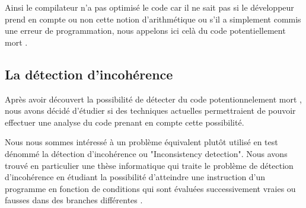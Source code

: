 Ainsi le compilateur n'a pas optimisé le code car il ne sait pas si le développeur prend en compte ou non cette notion d'arithmétique ou s'il a simplement commis une erreur de programmation, nous appelons ici celà du code \og potentiellement mort \fg{}.

\subsection{La détection d'incohérence}

Après avoir découvert la possibilité de détecter du code \og potentionnelement mort \fg{}, nous avons décidé d'étudier si des techniques actuelles permettraient de pouvoir effectuer une analyse du code prenant en compte cette possibilité.

Nous nous sommes intéressé à un problème équivalent plutôt utilisé en test dénommé la détection d'incohérence ou "Inconsistency detection". Nous avons trouvé en particulier une thèse informatique qui traite le problème de détection d'incohérence en étudiant la possibilité d'atteindre une instruction d'un programme en fonction de conditions qui sont évaluées successivement vraies ou fausses dans des branches différentes \cite{inconsistencies}.

